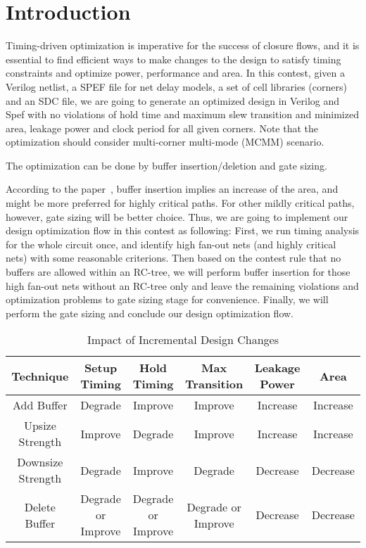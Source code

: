 \section{Introduction}
Timing-driven optimization is imperative for the success of closure flows, and it is essential to find efficient ways to make changes to the design to satisfy timing constraints and optimize power, performance and area. In this contest, given a Verilog netlist, a SPEF file for net delay models, a set of cell libraries (corners) and an SDC file, we are going to generate an optimized design in Verilog and Spef with no violations of hold time and maximum slew transition and minimized area, leakage power and clock period for all given corners. Note that the optimization should consider multi-corner multi-mode (MCMM) scenario.

The optimization can be done by buffer insertion/deletion and gate sizing.


According to the paper~\cite{Jiang:Interleaving}, buffer insertion implies an increase of the area, and might be more preferred for highly critical paths. For other mildly critical paths, however, gate sizing will be better choice. Thus, we are going to implement our design optimization flow in this contest as following: First, we run timing analysis for the whole circuit once, and identify high fan-out nets (and highly critical nets) with some reasonable criterions. Then based on the contest rule that no buffers are allowed within an RC-tree, we will perform buffer insertion for those high fan-out nets without an RC-tree only and leave the remaining violations and optimization problems to gate sizing stage for convenience. Finally, we will perform the gate sizing and conclude our design optimization flow.

\begin{table*}
\caption{Impact of Incremental Design Changes}
\label{table:Change}
\centering
\begin{tabular}{|c|c|c|c|c|c|} \hline
Technique & Setup Timing & Hold Timing & Max Transition & Leakage Power & Area \\ \hline
Add Buffer & Degrade & Improve & Improve & Increase & Increase\\ \hline
Upsize Strength & Improve & Degrade & Improve & Increase & Increase \\ \hline
Downsize Strength & Degrade & Improve & Degrade & Decrease & Decrease \\ \hline
Delete Buffer & Degrade or Improve & Degrade or Improve & Degrade or Improve & Decrease & Decrease \\ \hline
\end{tabular}
\vspace{-1em}
\end{table*}


